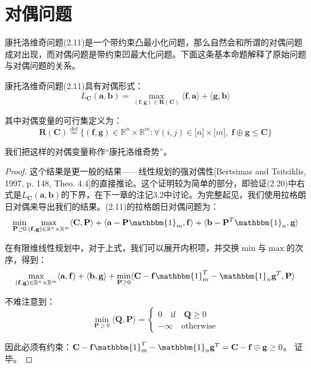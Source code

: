 \documentclass[cn,10pt,math=newtx,citestyle=gb7714-2015,bibstyle=gb7714-2015]{elegantbook}
\begin{document}
\section{对偶问题}

康托洛维奇问题(2.11)是一个带约束凸最小化问题，那么自然会和所谓的对偶问题成对出现，而对偶问题是带约束凹最大化问题。下面这条基本命题解释了原始问题与对偶问题的关系。

\begin{proposition}
康托洛维奇问题(2.11)具有对偶形式：
\begin{equation}
    \label{2.20}
    L_\mathbf{C}(\mathbf{a,b})=\max\limits_{(\mathbf{f,g})\in\mathbf{R}(\mathbf{C})} \langle \mathbf{f,a}\rangle + \langle \mathbf{g,b} \rangle
\end{equation}

其中对偶变量的可行集定义为：
\begin{equation}
    \label{2.21}
    \mathbf{R}(\mathbf{C})\overset{\text{def}}{=} \{(\mathbf{f,g})\in\mathbb{R}^n\times \mathbb{R}^m:\forall (i,j)\in\mathbb{[}n\mathbb{]}\times \mathbb{[}m\mathbb{]},\;\mathbf{f}\oplus \mathbf{g} \leq \mathbf{C}\}
\end{equation}

我们把这样的对偶变量称作“康托洛维奇势”。
\end{proposition}

\begin{proof}
这个结果是更一般的结果——线性规划的强对偶性[Bertsimas and Tsitsiklis, 1997, p. 148, Theo. 4.4]的直接推论。这个证明较为简单的部分，即验证(2.20)中右式是$L_\mathbf{C}(\mathbf{a,b})$的下界，在下一章的注记3.2中讨论。为完整起见，我们使用拉格朗日对偶来导出我们的结果。(2.11)的拉格朗日对偶问题为：
\begin{equation}
    \label{2.22}
    \min\limits_{\mathbf{P}\geq 0} \max\limits_{(\mathbf{f,g})\in\mathbb{R}^n\times \mathbb{R}^m} \langle \mathbf{C,P} \rangle + \langle \mathbf{a}-\mathbf{P}\mathbbm{1}_m, \mathbf{f} \rangle + \langle \mathbf{b}-\mathbf{P}^T\mathbbm{1}_n, \mathbf{g} \rangle
\end{equation}

在有限维线性规划中，对于上式，我们可以展开内积项，并交换$\min$与$\max$的次序，得到：
\begin{equation*}
    \max\limits_{(\mathbf{f,g})\in\mathbb{R}^n\times \mathbb{R}^m} \langle \mathbf{a,f} \rangle + \langle \mathbf{b,g} \rangle + \min\limits_{\mathbf{P}\geq 0} \langle \mathbf{C}-\mathbf{f}\mathbbm{1}_m^T-\mathbbm{1}_n\mathbf{g}^T,\mathbf{P} \rangle
\end{equation*}

不难注意到：
\begin{equation*}
    \min\limits_{\mathbf{P}\geq 0} \langle \mathbf{Q,P} \rangle = \left\{ \begin{array}{l} 0 \quad \text{if} \quad \mathbf{Q}\geq 0 \\ -\infty \quad \text{otherwise} \end{array} \right.
\end{equation*}

因此必须有约束：$\mathbf{C}-\mathbf{f}\mathbbm{1}_m^T-\mathbbm{1}_n\mathbf{g}^T = \mathbf{C} - \mathbf{f} \oplus \mathbf{g} \geq 0$。 证毕。

\end{proof}
\end{document}
